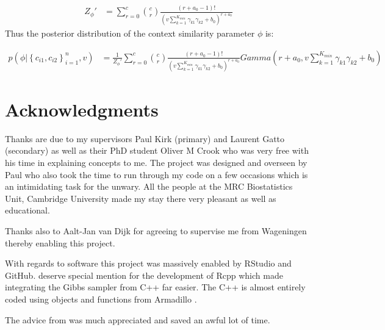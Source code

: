 \documentclass[11pt]{article} %
\begin{document}
\begin{align}
Z_{\phi}' &= \sum_{r=0}^c \binom{c}{r} \frac{(r + a_0 - 1)!}{ \left(v \sum_{k=1}^{K_{min}} \gamma_{k1} \gamma_{k2} + b_0 \right)^{r + a_0}} 
\end{align}
Thus the posterior distribution of the context similarity parameter $\phi$ is:

\begin{align}
p(\phi |  \left\{c_{i1}, c_{i2}\right\}_{i=1}^n, v) &=  \frac{1}{Z_{\phi}'} \sum_{r=0}^c  \binom{c}{r} \frac{(r + a_0 - 1)!}{ \left(v \sum_{k=1}^{K_{min}} \gamma_{k1} \gamma_{k2} + b_0 \right)^{r + a_0}} Gamma \left(r+ a_0, v \sum_{k=1}^{K_{min}} \gamma_{k1} \gamma_{k2} + b_0 \right)
\end{align}

\newpage
\section*{Acknowledgments}
Thanks are due to my supervisors Paul Kirk (primary) and Laurent Gatto (secondary) as well as their PhD student Oliver M Crook who was very free with his time in explaining concepts to me. The project was designed and overseen by Paul who also took the time to run through my code on a few occasions which is an intimidating task for the unwary. All the people at the MRC Biostatistics Unit, Cambridge University made my stay there very pleasant as well as educational.

Thanks also to Aalt-Jan van Dijk for agreeing to supervise me from Wageningen thereby enabling this project.

With regards to software this project was massively enabled by RStudio \cite{RStudioTeamRStudioIntegratedDevelopment2016} and GitHub. \citet{EddelbuettelRcppSeamlessIntegration2011} deserve special mention for the development of Rcpp which made integrating the Gibbs sampler from C++ far easier. The C++ is almost entirely coded using objects and functions from Armadillo \cite{SandersonArmadillotemplatebasedlibrary2016}.

The advice from \citet{BryanExcusemeyou} was much appreciated and saved an awful lot of time. 

\newpage
%


\end{document}
